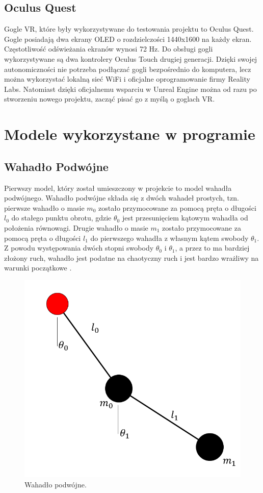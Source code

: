 \documentclass[a4paper,12pt,reqno]{article}
\begin{document}
\subsection{Oculus Quest}

Gogle VR, które były wykorzystywane do testowania projektu to Oculus Quest. Gogle posiadają dwa ekrany OLED o rozdzielczości 1440x1600 na każdy ekran. Częstotliwość odświeżania ekranów wynosi 72 Hz. Do obsługi gogli wykorzystywane są dwa kontrolery Oculus Touch drugiej generacji. Dzięki swojej autonomiczności nie potrzeba podłączać gogli bezpośrednio do komputera, lecz można wykorzystać lokalną sieć WiFi i oficjalne oprogramowanie firmy Reality Labs. Natomiast dzięki oficjalnemu wsparciu w Unreal Engine można od razu po stworzeniu nowego projektu, zacząć pisać go z myślą o goglach VR.


\section{Modele wykorzystane w programie}

\subsection{Wahadło Podwójne}

Pierwszy model, który został umieszczony w projekcie to model wahadła podwójnego. Wahadło podwójne składa się z dwóch wahadeł prostych, tzn. pierwsze wahadło o masie $m_0$ zostało przymocowane za pomocą pręta o długości $l_0$ do stałego punktu obrotu, gdzie $\theta_0$ jest przesunięciem kątowym wahadła od położenia równowagi. Drugie wahadło o masie $m_1$ zostało przymocowane za pomocą pręta o długości $l_1$ do pierwszego wahadła z własnym kątem swobody $\theta_1$. Z powodu występowania dwóch stopni swobody $\theta_0$ i $\theta_1$, a przez to ma bardziej złożony ruch, wahadło jest podatne na chaotyczny ruch i jest bardzo wrażliwy na warunki początkowe  \cite{double_pendulum_book}.

\begin{figure}[!ht]%
\centering
\includegraphics[width=0.5\columnwidth]{graphics/pendulum/DoublePendulum.png}
\caption{Wahadło podwójne.
\label{BPExample}}%
%
\qquad
\end{figure}  
\end{document}
